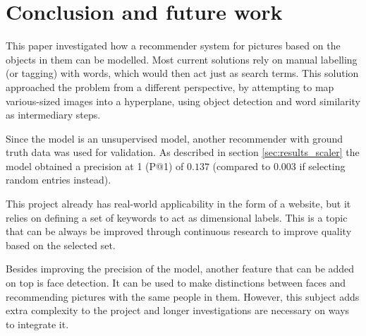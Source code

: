 \chapter{Conclusion and future work}
\label{chap:conclusion}

This paper investigated how a recommender system for pictures based on the objects in them can be modelled. Most current solutions rely on manual labelling (or tagging) with words, which would then act just as search terms. This solution approached the problem from a different perspective, by attempting to map various-sized images into a hyperplane, using object detection and word similarity as intermediary steps. 

Since the model is an unsupervised model, another recommender with ground truth data was used for validation. As described in section \ref{sec:results_scaler} the model obtained a precision at 1 (P@1) of $0.137$ (compared to $0.003$ if selecting random entries instead).

This project already has real-world applicability in the form of a website, but it relies on defining a set of keywords to act as dimensional labels. This is a topic that can be always be improved through continuous research to improve quality based on the selected set.

Besides improving the precision of the model, another feature that can be added on top is face detection. It can be used to make distinctions between faces and recommending pictures with the same people in them. However, this subject adds extra complexity to the project and longer investigations are necessary on ways to integrate it.